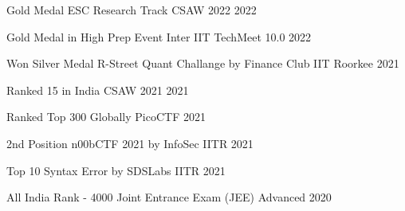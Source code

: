 


\begin{cvhonors}


\cvhonor
{Gold Medal ESC Research Track} %
{CSAW 2022}  %
{} %
{2022} %

  \cvhonor
{Gold Medal in High Prep Event} %
{Inter IIT TechMeet 10.0}  %
{} %
{2022} %

  \cvhonor
{Won Silver Medal} %
{R-Street Quant Challange by Finance Club IIT Roorkee}  %
{} %
{2021} %

  \cvhonor
{Ranked 15 in India} %
{CSAW 2021}  %
{} %
{2021} %

  \cvhonor
{Ranked Top 300 Globally} %
{PicoCTF}  %
{} %
{2021} %


  \cvhonor
{2nd Position} %
{n00bCTF 2021 by InfoSec IITR}  %
{} %
{2021} %

  \cvhonor
{Top 10} %
{Syntax Error by SDSLabs IITR}  %
{} %
{2021} %

  \cvhonor
{All India Rank - 4000} %
{Joint Entrance Exam (JEE) Advanced }  %
{} %
{2020} %






	


\end{cvhonors}

